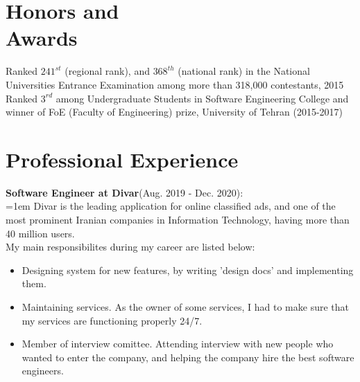 \documentclass[line, mm]{sampleCV}
\begin{document}
\begin{resume}
    \section{\mysidestyle Honors and\\Awards} 

   Ranked $241^{st}$ (regional rank), and $368^{th}$ (national rank) in the National Universities Entrance Examination among more than 318,000 contestants, 2015 \\
Ranked $3^{rd}$ among Undergraduate Students in Software Engineering College and winner of FoE (Faculty of Engineering) prize, University of Tehran (2015-2017)\\

\section{\mysidestyle Professional Experience}

\textbf{Software Engineer at Divar}(Aug. 2019 - Dec. 2020): \\
\hangindent=1em
Divar is the leading application for online classified ads, and one of the most prominent Iranian companies in Information Technology, having more than 40 million users. \\ My main responsibilites during my career are listed below:
\begin{itemize}
	\item Designing system for new features, by writing 'design docs' and implementing them.
	\item Maintaining services. As the owner of some services, I had to make sure that my services are functioning properly 24/7. 
	\item Member of interview comittee. Attending interview with new people who wanted to enter the company, and helping the company hire the best software engineers.
\end{itemize}




\end{resume}
\end{document}
